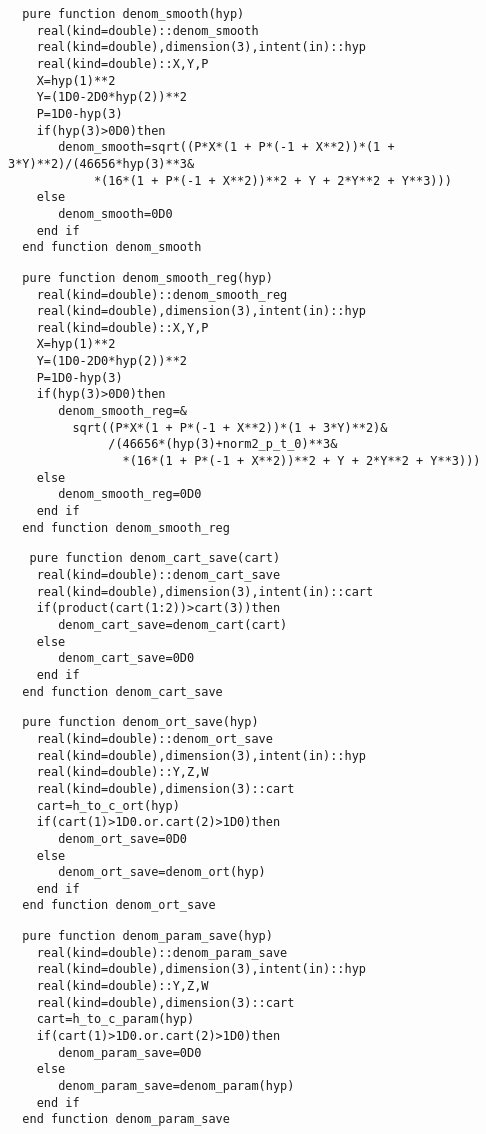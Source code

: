 \begin{Verbatim}
  pure function denom_smooth(hyp)
    real(kind=double)::denom_smooth
    real(kind=double),dimension(3),intent(in)::hyp
    real(kind=double)::X,Y,P
    X=hyp(1)**2
    Y=(1D0-2D0*hyp(2))**2
    P=1D0-hyp(3)
    if(hyp(3)>0D0)then
       denom_smooth=sqrt((P*X*(1 + P*(-1 + X**2))*(1 + 3*Y)**2)/(46656*hyp(3)**3&
            *(16*(1 + P*(-1 + X**2))**2 + Y + 2*Y**2 + Y**3)))
    else
       denom_smooth=0D0
    end if
  end function denom_smooth
\end{Verbatim}

\begin{Verbatim}
  pure function denom_smooth_reg(hyp)
    real(kind=double)::denom_smooth_reg
    real(kind=double),dimension(3),intent(in)::hyp
    real(kind=double)::X,Y,P
    X=hyp(1)**2
    Y=(1D0-2D0*hyp(2))**2
    P=1D0-hyp(3)
    if(hyp(3)>0D0)then
       denom_smooth_reg=&
         sqrt((P*X*(1 + P*(-1 + X**2))*(1 + 3*Y)**2)&
              /(46656*(hyp(3)+norm2_p_t_0)**3&
                *(16*(1 + P*(-1 + X**2))**2 + Y + 2*Y**2 + Y**3)))
    else
       denom_smooth_reg=0D0
    end if
  end function denom_smooth_reg
\end{Verbatim}
  
\begin{Verbatim}
   pure function denom_cart_save(cart)
    real(kind=double)::denom_cart_save
    real(kind=double),dimension(3),intent(in)::cart
    if(product(cart(1:2))>cart(3))then
       denom_cart_save=denom_cart(cart)
    else
       denom_cart_save=0D0
    end if
  end function denom_cart_save
\end{Verbatim}

\begin{Verbatim}
  pure function denom_ort_save(hyp)
    real(kind=double)::denom_ort_save
    real(kind=double),dimension(3),intent(in)::hyp
    real(kind=double)::Y,Z,W
    real(kind=double),dimension(3)::cart
    cart=h_to_c_ort(hyp)
    if(cart(1)>1D0.or.cart(2)>1D0)then
       denom_ort_save=0D0
    else
       denom_ort_save=denom_ort(hyp)
    end if
  end function denom_ort_save
\end{Verbatim}

\begin{Verbatim}
  pure function denom_param_save(hyp)
    real(kind=double)::denom_param_save
    real(kind=double),dimension(3),intent(in)::hyp
    real(kind=double)::Y,Z,W
    real(kind=double),dimension(3)::cart
    cart=h_to_c_param(hyp)
    if(cart(1)>1D0.or.cart(2)>1D0)then
       denom_param_save=0D0
    else
       denom_param_save=denom_param(hyp)
    end if
  end function denom_param_save
\end{Verbatim}

